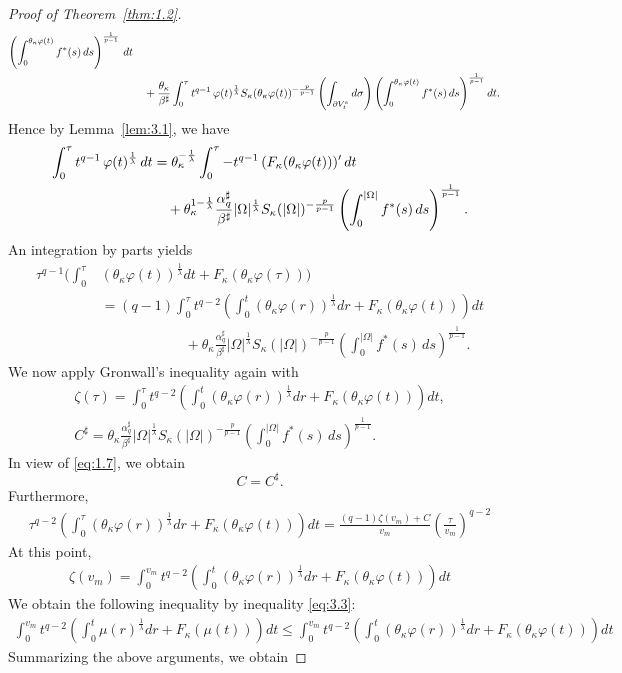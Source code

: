 \documentclass[11pt]{article}
\numberwithin{equation}{section}
\theoremstyle{definition}
\theoremstyle{remark}
\begin{document}
\begin{proof}[Proof of Theorem~\ref{thm:1.2}]
\begin{align*}
\left(\int_0^{\theta_\kappa\varphi(t)} f^*(s)\,ds\right)^{\frac{1}{p-1}}\,dt
\notag\\
&\quad
+\frac{\theta_\kappa}{\beta^\sharp}
\int_0^\tau
t^{q-1}\,\varphi(t)^{\frac{1}{\lambda}}{S_\kappa}(\theta_\kappa\varphi(t))^{-\frac{p}{p-1}}
\left(\int_{\partial V_t^e} d\sigma\right)
\left(\int_0^{\theta_\kappa\varphi(t)} f^*(s)\,ds\right) ^\frac{1}{p-1}dt.
\end{align*}
Hence by Lemma~\ref{lem:3.1}, we have
\begin{align}\label{eq:3.6}
\int_0^\tau t^{q-1}\,\varphi(t)^{\frac{1}{\lambda}}\,dt
&=
\theta_\kappa^{-\frac{1}{\lambda}}
\int_0^\tau
-t^{q-1}\,(F_\kappa(\theta_\kappa\varphi(t)))'\,dt
\notag\\
&\quad
+\theta_\kappa^{1-\frac{1}{\lambda}}\frac{\alpha_q^\sharp}{\beta^\sharp}
|\Omega|^{\frac{1}{\lambda}}S_\kappa(|\Omega|)^{-\frac{p}{p-1}}
\left(\int_0^{|\Omega|} f^*(s)\,ds\right)^{\frac{1}{p-1}}.
\end{align}
An integration by parts yields
\begin{align*}
\tau^{q-1}\Biggl(
  \int_0^\tau &(\theta_\kappa\varphi(t))^\frac{1}{\lambda}dt + F_\kappa(\theta_\kappa\varphi(\tau))
\Biggr)\\
&= (q-1)\int_0^\tau t^{q-2}\left(\int_0^t (\theta_\kappa\varphi(r))^\frac1\lambda dr +F_\kappa(\theta_\kappa\varphi(t))\right)dt\\
 &\qquad\qquad\qquad+\theta_\kappa\frac{\alpha_q^\sharp}{\beta^\sharp}
|\Omega|^{\frac{1}{\lambda}}S_\kappa(|\Omega|)^{-\frac{p}{p-1}}
\left(\int_0^{|\Omega|} f^*(s)\,ds\right)^{\frac{1}{p-1}}. 
\end{align*}
We now apply Gronwall's inequality again with
\begin{align*}
\zeta(\tau) = \int_0^\tau t^{q-2}\left(\int_0^t (\theta_\kappa\varphi(r))^\frac1\lambda dr +F_\kappa(\theta_\kappa\varphi(t))\right)dt, \\
C^\sharp= \theta_\kappa\frac{\alpha_q^\sharp}{\beta^\sharp}
|\Omega|^{\frac{1}{\lambda}}S_\kappa(|\Omega|)^{-\frac{p}{p-1}}
\left(\int_0^{|\Omega|} f^*(s)\,ds\right)^{\frac{1}{p-1}}. 
\end{align*}
In view of \eqref{eq:1.7}, we obtain
\[
C=C^\sharp.
\]
Furthermore,
\begin{align*}
 \tau^{q-2}\left(\int_0^\tau (\theta_\kappa\varphi(r))^\frac1\lambda dr 
+F_\kappa(\theta_\kappa\varphi(t))\right)dt
=
\frac{(q-1)\zeta(v_m)+C}{v_m}\left(\frac{\tau}{v_m}\right)^{q-2}
\end{align*}
At this point,
\begin{align*}
  \zeta(v_m)
  =
\int_0^{v_m} t^{q-2}\left(\int_0^t (\theta_\kappa\varphi(r))^\frac1\lambda dr 
+F_\kappa(\theta_\kappa\varphi(t))\right)dt
\end{align*}
We obtain the following inequality by inequality \eqref{eq:3.3}:
\begin{align*}
  \int_0^{v_m} t^{q-2}\left(\int_0^t \mu(r)^\frac1\lambda dr +F_\kappa(\mu(t))\right)dt
  \le
    \int_0^{v_m} t^{q-2}\left(\int_0^t (\theta_\kappa\varphi(r))^\frac1\lambda dr 
    +F_\kappa(\theta_\kappa\varphi(t))\right)dt
\end{align*}
Summarizing the above arguments, we obtain


\end{proof}
\end{document}
